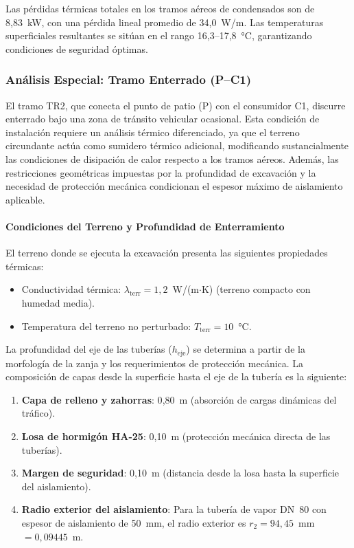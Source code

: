\documentclass[12pt]{article}
\begin{document}
Las pérdidas térmicas totales en los tramos aéreos de condensados son de 8{,}83~kW, con una pérdida lineal promedio de 34{,}0~W/m. Las temperaturas superficiales resultantes se sitúan en el rango 16{,}3--17{,}8~°C, garantizando condiciones de seguridad óptimas.


\subsubsection{Análisis Especial: Tramo Enterrado (P--C1)}
\label{subsubsec:tramo_enterrado}

El tramo TR2, que conecta el punto de patio (P) con el consumidor C1, discurre enterrado bajo una zona de tránsito vehicular ocasional. Esta condición de instalación requiere un análisis térmico diferenciado, ya que el terreno circundante actúa como sumidero térmico adicional, modificando sustancialmente las condiciones de disipación de calor respecto a los tramos aéreos. Además, las restricciones geométricas impuestas por la profundidad de excavación y la necesidad de protección mecánica condicionan el espesor máximo de aislamiento aplicable.

\paragraph{Condiciones del Terreno y Profundidad de Enterramiento}
\label{par:condiciones_terreno}

El terreno donde se ejecuta la excavación presenta las siguientes propiedades térmicas:

\begin{itemize}[noitemsep]
	\item Conductividad térmica: $\lambda_{\text{terr}} = 1{,}2$~W/(m$\cdot$K) (terreno compacto con humedad media).
	\item Temperatura del terreno no perturbado: $T_{\text{terr}} = 10$~°C.
\end{itemize}

La profundidad del eje de las tuberías ($h_{\text{eje}}$) se determina a partir de la morfología de la zanja y los requerimientos de protección mecánica. La composición de capas desde la superficie hasta el eje de la tubería es la siguiente:

\begin{enumerate}[noitemsep]
	\item \textbf{Capa de relleno y zahorras}: 0{,}80~m (absorción de cargas dinámicas del tráfico).
	\item \textbf{Losa de hormigón HA-25}: 0{,}10~m (protección mecánica directa de las tuberías).
	\item \textbf{Margen de seguridad}: 0{,}10~m (distancia desde la losa hasta la superficie del aislamiento).
	\item \textbf{Radio exterior del aislamiento}: Para la tubería de vapor DN~80 con espesor de aislamiento de 50~mm, el radio exterior es $r_2 = 94{,}45$~mm $= 0{,}09445$~m.
\end{enumerate}
\end{document}
